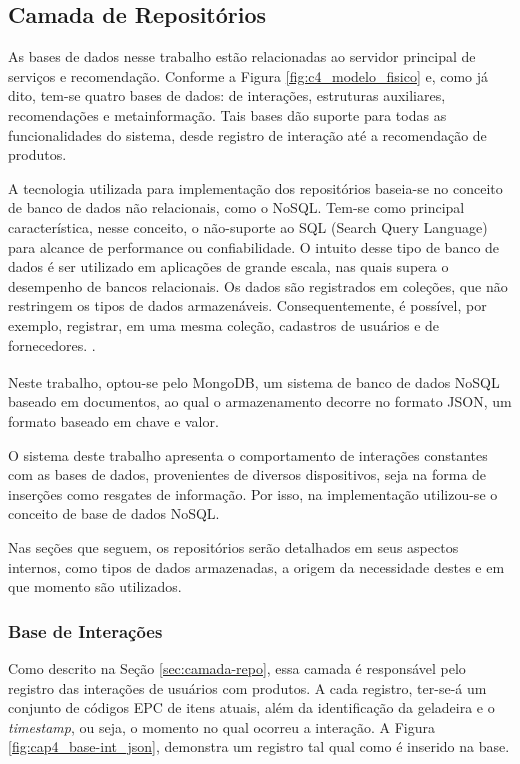 \subsection{Camada de Repositórios}

As bases de dados nesse trabalho estão relacionadas ao servidor principal de serviços e recomendação. Conforme a Figura \ref{fig:c4_modelo_fisico} e, como já dito, tem-se quatro bases de dados: de interações, estruturas auxiliares, recomendações e metainformação. Tais bases dão suporte para todas as funcionalidades do sistema, desde registro de interação até a recomendação de produtos. 

A tecnologia utilizada para implementação dos repositórios baseia-se no conceito de banco de dados não relacionais, como o NoSQL. Tem-se como principal característica, nesse conceito, o não-suporte ao SQL (Search Query Language) para alcance de performance ou confiabilidade. O intuito desse tipo de banco de dados é ser utilizado em aplicações de grande escala, nas quais supera o desempenho de bancos relacionais. Os dados são registrados em coleções, que não restringem os tipos de dados armazenáveis. Consequentemente, é possível, por exemplo, registrar, em uma mesma coleção, cadastros de usuários e de fornecedores. \cite{Boicea2012}. 

Neste trabalho, optou-se pelo MongoDB\textsuperscript{\textregistered}, um sistema de banco de dados NoSQL baseado em documentos, ao qual o armazenamento decorre no formato JSON, um formato baseado em chave e valor. 

O sistema deste trabalho apresenta o comportamento de interações constantes com as bases de dados, provenientes de diversos dispositivos, seja na forma de inserções como resgates de informação. Por isso, na implementação utilizou-se o conceito de base de dados NoSQL.

Nas seções que seguem, os repositórios serão detalhados em seus aspectos internos, como tipos de dados armazenadas, a origem da necessidade destes e em que momento são utilizados.

\subsubsection{Base de Interações}

Como descrito na Seção \ref{sec:camada-repo}, essa camada é responsável pelo registro das interações de usuários com produtos. A cada registro, ter-se-á um conjunto de códigos EPC de itens atuais, além da identificação da geladeira e o \textit{timestamp}, ou seja, o momento no qual ocorreu a interação. A Figura \ref{fig:cap4_base-int_json}, demonstra um registro tal qual como é inserido na base.

